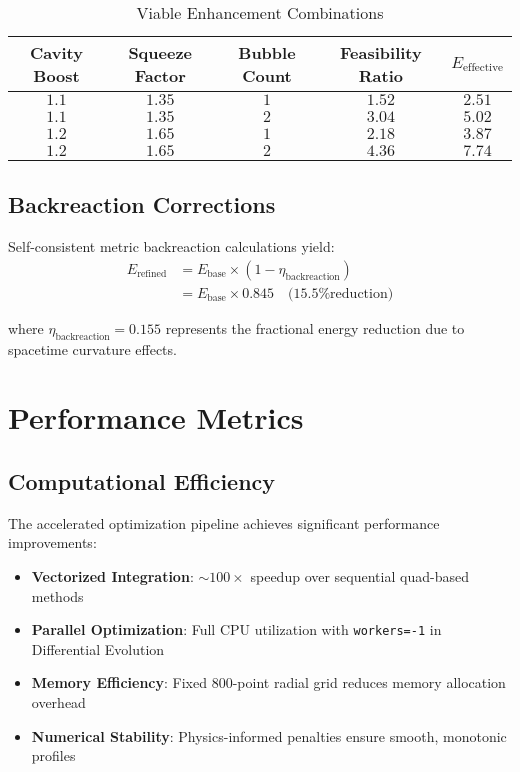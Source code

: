 \documentclass[12pt]{article}
\begin{document}
\begin{table}[ht]
\centering
\caption{Viable Enhancement Combinations}
\label{tab:enhancement_combinations}
\begin{tabular}{@{}ccccc@{}}
\toprule
\textbf{Cavity Boost} & \textbf{Squeeze Factor} & \textbf{Bubble Count} & \textbf{Feasibility Ratio} & \textbf{$E_{\text{effective}}$} \\
\midrule
$1.1$ & $1.35$ & $1$ & $1.52$ & $2.51$ \\
$1.1$ & $1.35$ & $2$ & $3.04$ & $5.02$ \\
$1.2$ & $1.65$ & $1$ & $2.18$ & $3.87$ \\
$1.2$ & $1.65$ & $2$ & $4.36$ & $7.74$ \\
\bottomrule
\end{tabular}
\end{table}

\subsection{Backreaction Corrections}

Self-consistent metric backreaction calculations yield:
\begin{align}
E_{\text{refined}} &= E_{\text{base}} \times (1 - \eta_{\text{backreaction}}) \\
&= E_{\text{base}} \times 0.845 \quad \text{(15.5\% reduction)}
\end{align}

where $\eta_{\text{backreaction}} = 0.155$ represents the fractional energy reduction due to spacetime curvature effects.

\section{Performance Metrics}

\subsection{Computational Efficiency}

The accelerated optimization pipeline achieves significant performance improvements:

\begin{itemize}
\item \textbf{Vectorized Integration}: $\sim100\times$ speedup over sequential quad-based methods
\item \textbf{Parallel Optimization}: Full CPU utilization with \texttt{workers=-1} in Differential Evolution
\item \textbf{Memory Efficiency}: Fixed 800-point radial grid reduces memory allocation overhead
\item \textbf{Numerical Stability}: Physics-informed penalties ensure smooth, monotonic profiles
\end{itemize}
\end{document}
